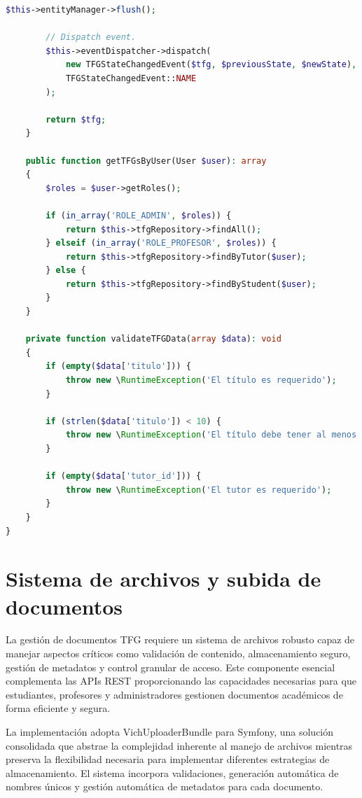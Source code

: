 \documentclass[12pt,a4paper,oneside]{report}
\begin{document}
\begin{lstlisting}[language=PHP]
        $this->entityManager->flush();

        // Dispatch event.
        $this->eventDispatcher->dispatch(
            new TFGStateChangedEvent($tfg, $previousState, $newState),
            TFGStateChangedEvent::NAME
        );

        return $tfg;
    }

    public function getTFGsByUser(User $user): array
    {
        $roles = $user->getRoles();

        if (in_array('ROLE_ADMIN', $roles)) {
            return $this->tfgRepository->findAll();
        } elseif (in_array('ROLE_PROFESOR', $roles)) {
            return $this->tfgRepository->findByTutor($user);
        } else {
            return $this->tfgRepository->findByStudent($user);
        }
    }

    private function validateTFGData(array $data): void
    {
        if (empty($data['titulo'])) {
            throw new \RuntimeException('El título es requerido');
        }

        if (strlen($data['titulo']) < 10) {
            throw new \RuntimeException('El título debe tener al menos 10 caracteres');
        }

        if (empty($data['tutor_id'])) {
            throw new \RuntimeException('El tutor es requerido');
        }
    }
}
\end{lstlisting}

\section{Sistema de archivos y
subida de documentos}\label{sistema-de-archivos-y-subida-de-documentos}

La gestión de documentos TFG requiere un sistema de archivos robusto capaz de manejar aspectos críticos como validación de contenido, almacenamiento seguro, gestión de metadatos y control granular de acceso. Este componente esencial complementa las APIs REST proporcionando las capacidades necesarias para que estudiantes, profesores y administradores gestionen documentos académicos de forma eficiente y segura.

La implementación adopta VichUploaderBundle para Symfony, una solución consolidada que abstrae la complejidad inherente al manejo de archivos mientras preserva la flexibilidad necesaria para implementar diferentes estrategias de almacenamiento. El sistema incorpora validaciones, generación automática de nombres únicos y gestión
automática de metadatos para cada documento.
\end{document}
